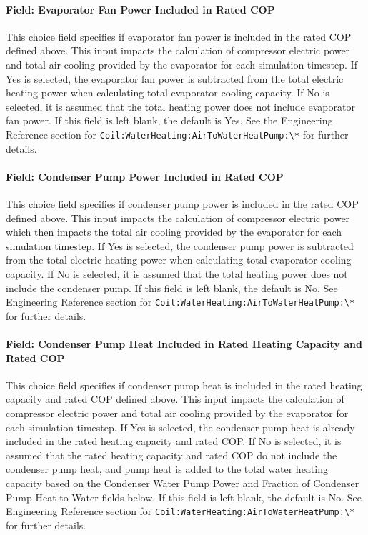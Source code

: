 \paragraph{Field: Evaporator Fan Power Included in Rated COP}\label{field-evaporator-fan-power-included-in-rated-cop}

This choice field specifies if evaporator fan power is included in the rated COP defined above. This input impacts the calculation of compressor electric power and total air cooling provided by the evaporator for each simulation timestep. If Yes is selected, the evaporator fan power is subtracted from the total electric heating power when calculating total evaporator cooling capacity. If No is selected, it is assumed that the total heating power does not include evaporator fan power. If this field is left blank, the default is Yes. See the Engineering Reference section for \lstinline!Coil:WaterHeating:AirToWaterHeatPump:\*! for further details.

\paragraph{Field: Condenser Pump Power Included in Rated COP}\label{field-condenser-pump-power-included-in-rated-cop}

This choice field specifies if condenser pump power is included in the rated COP defined above. This input impacts the calculation of compressor electric power which then impacts the total air cooling provided by the evaporator for each simulation timestep. If Yes is selected, the condenser pump power is subtracted from the total electric heating power when calculating total evaporator cooling capacity. If No is selected, it is assumed that the total heating power does not include the condenser pump. If this field is left blank, the default is No. See Engineering Reference section for \lstinline!Coil:WaterHeating:AirToWaterHeatPump:\*! for further details.

\paragraph{Field: Condenser Pump Heat Included in Rated Heating Capacity and Rated COP}\label{field-condenser-pump-heat-included-in-rated-heating-capacity-and-rated-cop}

This choice field specifies if condenser pump heat is included in the rated heating capacity and rated COP defined above. This input impacts the calculation of compressor electric power and total air cooling provided by the evaporator for each simulation timestep. If Yes is selected, the condenser pump heat is already included in the rated heating capacity and rated COP. If No is selected, it is assumed that the rated heating capacity and rated COP do not include the condenser pump heat, and pump heat is added to the total water heating capacity based on the Condenser Water Pump Power and Fraction of Condenser Pump Heat to Water fields below. If this field is left blank, the default is No. See Engineering Reference section for \lstinline!Coil:WaterHeating:AirToWaterHeatPump:\*! for further details.

